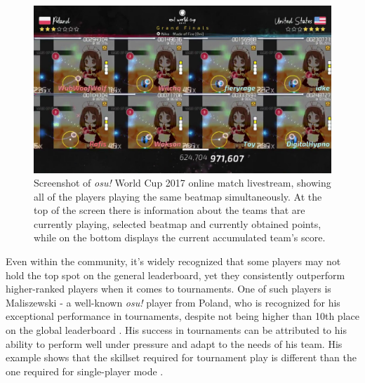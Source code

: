 \begin{figure}[h]
    \centering\includegraphics[scale=0.35]{obrazki/osuthumbnail.jpg}
    \caption{Screenshot of \textit{osu!} World Cup 2017 online match livestream, showing all of the players playing the same beatmap simultaneously. At the top of the screen there is information about the teams that are currently playing, selected beatmap and currently obtained points, while on the bottom displays the current accumulated team’s score. \cite{osuowc}}
    \label{fig:osuwctb}
\end{figure}

Even within the community, it's widely recognized that some players may not hold the top spot on the general leaderboard, yet they consistently outperform higher-ranked players when it comes to tournaments. One of such players is Maliszewski - a well-known \textit{osu!} player from Poland, who is recognized for his exceptional performance in tournaments, despite not being higher than 10th place on the global leaderboard \cite{maliszewskiliquid}. His success in tournaments can be attributed to his ability to perform well under pressure and adapt to the needs of his team. His example shows that the skillset required for tournament play is different than the one required for single-player mode \cite{maliszewski}.
